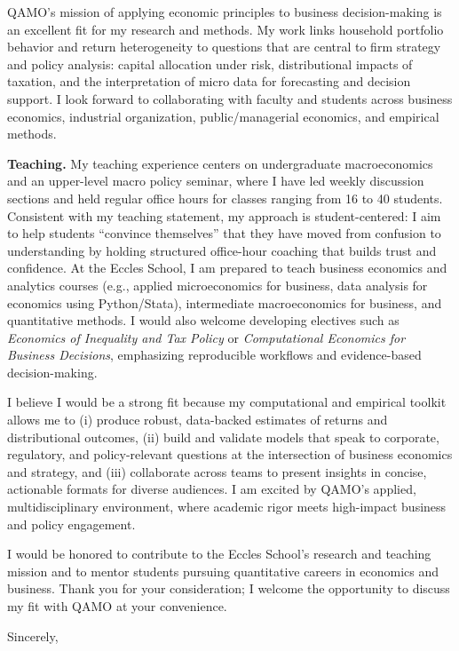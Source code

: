 \documentclass[11pt,letterpaper]{letter}
\begin{document}
\begin{letter}
QAMO’s mission of applying economic principles to business decision-making is an excellent fit for my research and methods. My work links household portfolio behavior and return heterogeneity to questions that are central to firm strategy and policy analysis: capital allocation under risk, distributional impacts of taxation, and the interpretation of micro data for forecasting and decision support. I look forward to collaborating with faculty and students across business economics, industrial organization, public/managerial economics, and empirical methods.

\textbf{Teaching.} My teaching experience centers on undergraduate macroeconomics and an upper-level macro policy seminar, where I have led weekly discussion sections and held regular office hours for classes ranging from 16 to 40 students. Consistent with my teaching statement, my approach is student-centered: I aim to help students ``convince themselves'' that they have moved from confusion to understanding by holding structured office-hour coaching that builds trust and confidence. At the Eccles School, I am prepared to teach business economics and analytics courses (e.g., applied microeconomics for business, data analysis for economics using Python/Stata), intermediate macroeconomics for business, and quantitative methods. I would also welcome developing electives such as \textit{Economics of Inequality and Tax Policy} or \textit{Computational Economics for Business Decisions}, emphasizing reproducible workflows and evidence-based decision-making.

I believe I would be a strong fit because my computational and empirical toolkit allows me to (i) produce robust, data-backed estimates of returns and distributional outcomes, (ii) build and validate models that speak to corporate, regulatory, and policy-relevant questions at the intersection of business economics and strategy, and (iii) collaborate across teams to present insights in concise, actionable formats for diverse audiences. I am excited by QAMO’s applied, multidisciplinary environment, where academic rigor meets high-impact business and policy engagement.

I would be honored to contribute to the Eccles School’s research and teaching mission and to mentor students pursuing quantitative careers in economics and business. Thank you for your consideration; I welcome the opportunity to discuss my fit with QAMO at your convenience.

\closing{Sincerely,}

\end{letter}
\end{document}
